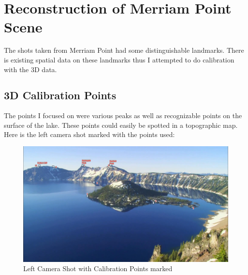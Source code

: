 \documentclass[11pt,psfig]{article}
\begin{document}
\newpage

\section{Reconstruction of Merriam Point Scene}

The shots taken from Merriam Point had some distinguishable landmarks. There is existing spatial data on these landmarks thus I attempted to do calibration with the 3D data. 

\subsection{3D Calibration Points}

The points I focused on were various peaks as well as recognizable points on the surface of the lake. These points could easily be spotted in a topographic map. Here is the left camera shot marked with the points used:
\begin{figure}[H]
\centering
\includegraphics[width=\columnwidth]{sfmResults1/Photo_withPoints.png}
\caption{Left Camera Shot with Calibration Points marked}
\end{figure}

\newpage
\end{document}
